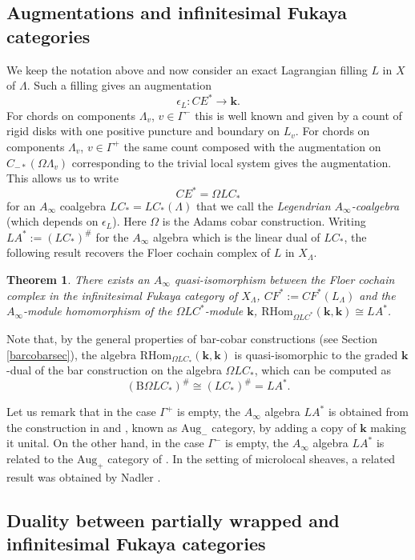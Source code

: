 \documentclass{gtpart}
\newtheorem{thm}{Theorem}
\renewcommand{\k}{\mathbf{k}}
\newcommand{\Cobar}{\Omega}
\renewcommand{\Bar}{\mathrm{B}}
\begin{document}
\subsection{Augmentations and infinitesimal Fukaya categories}\label{ssec:infinteswrap} 
We keep the notation above and now consider an exact Lagrangian filling $L$ in $X$ of $\Lambda$. Such a filling gives an augmentation 
\[ 
\epsilon_{L} \colon CE^*  \to \k.  
\]
For chords on components $\Lambda_{v}$, $v\in\Gamma^{-}$ this is well known and given by a count of
rigid disks with one positive puncture and boundary on $L_{v}$. For chords on components
$\Lambda_{v}$, $v\in\Gamma^{+}$ the same count composed with the augmentation on $C_{-\ast}(\Omega\Lambda_{v})$ corresponding to the trivial local system gives the augmentation.
This allows us to write 
\[ CE^* = \Omega LC_* \]
for an $A_\infty$ coalgebra $LC_*=LC_{\ast}(\Lambda)$ that we call the \emph{Legendrian $A_\infty$-coalgebra} (which depends on $\epsilon_L$). Here $\Omega$ is the Adams cobar
construction. Writing $LA^{\ast}:= (LC_*)^{\#}$ for the $A_{\infty}$ algebra which is the linear dual of $LC_{\ast}$, the following result recovers the Floer cochain complex of $L$ in $X_\Lambda$.
\begin{thm} \label{generation} There exists an $A_\infty$ quasi-isomorphism between the Floer cochain complex
    in the infinitesimal Fukaya category of $X_\Lambda$,
    $CF^* := CF^*(L_\Lambda)$ 
and the $A_\infty$-module homomorphism of the $\Omega LC^*$-module $\k$,
    $\mathrm{RHom}_{\Omega LC^*} (\k, \k ) \cong LA^*$.
\end{thm}

Note that, by the general properties of bar-cobar constructions (see Section \ref{barcobarsec}), the
algebra $\mathrm{RHom}_{\Omega LC_*} (\k, \k )$ is quasi-isomorphic to the graded
$\k$-dual of the bar construction on the algebra $\Omega LC_*$, which can be computed as 
\[
(\Bar \Cobar LC_*)^\#\cong (LC_*)^\# = LA^*.
\] 

Let us remark that in the case $\Gamma^{+}$ is empty, the $A_\infty$ algebra $LA^*$ is obtained from
the construction in \cite{CEKSW} and \cite{BC}, known as $\mathrm{Aug}_-$ category, by adding a copy of $\k$ making it unital. On the other
hand, in the case $\Gamma^{-}$ is empty, the $A_\infty$ algebra $LA^*$ is related to the
$\mathrm{Aug}_+$ category of \cite{NRSSZ}. In the setting of microlocal sheaves, a related result
was obtained by Nadler \cite[Theorem 1.6]{nadler}.


\subsection{Duality between partially wrapped and infinitesimal Fukaya categories}\label{ssec:connections} 
\end{document}
